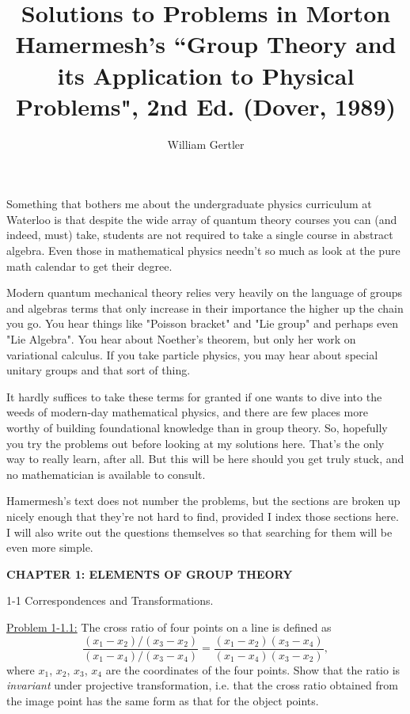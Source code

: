 \documentclass[12pt]{article}
\title{Solutions to Problems in Morton Hamermesh's ``Group Theory and its
Application to Physical Problems", 2nd Ed. (Dover, 1989)}
\author{William Gertler}
\begin{document}
\maketitle

Something that bothers me about the undergraduate physics curriculum at
Waterloo is that despite the wide array of quantum theory courses you can
(and indeed, must) take, students are not required to take a single course in
abstract algebra. Even those in mathematical physics needn't so much as look at
the pure math calendar to get their degree.

Modern quantum mechanical theory relies very heavily on the
language of groups and algebras \textendash terms that only increase in their importance
the higher up the chain you go. You hear things like "Poisson bracket" and
"Lie group" and perhaps even "Lie Algebra". You hear about Noether's theorem,
but only her work on variational calculus. If you take particle physics,
you may hear about special unitary groups and that sort of thing.

It hardly suffices to take these terms for granted if one wants to dive into the
weeds of modern-day mathematical physics, and there are few places more worthy
of building foundational knowledge than in group theory. So, hopefully you try
the problems out before looking at my solutions here. That's the only way to
really learn, after all. But this will be here should you get truly stuck, and
no mathematician is available to consult.

Hamermesh's text does not number the problems, but the sections are broken up
nicely enough that they're not hard to find, provided I index those sections
here. I will also write out the questions themselves so that searching for them
will be even more simple.

\newpage

\textbf{CHAPTER 1: ELEMENTS OF GROUP THEORY}

1-1 Correspondences and Transformations.

\underline{Problem 1-1.1:} The cross ratio of four points on a line is defined
as
\[ 
\frac{(x_1 - x_2)/(x_3 - x_2)}{(x_1-x_4)/(x_3-x_4)} =
\frac{(x_1 - x_2)(x_3 - x_4)}{(x_1-x_4)(x_3-x_2)},
\]
where $x_1$, $x_2$, $x_3$, $x_4$ are the coordinates of the four points. Show
that the ratio is \textit{invariant} under projective transformation, i.e. that
the cross ratio obtained from the image point has the same form as that for the
object points.
\end{document}
